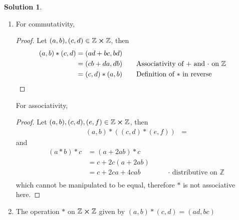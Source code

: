 \documentclass[10pt]{article}
\theoremstyle{definition}
\newtheorem{soln}{Solution}
\newcommand{\justif}[2]{&{#1}&\text{#2}}
\begin{document}
\begin{soln}
\begin{enumerate}[label=(\alph*)]
\begin{proof}
\begin{align*}
                      & = a+ 2a(b+2bc)                                                    \\
                      & = a+ 2ab+4abc\justif{\quad}{$\cdot$ distributive on $\mathbb{Z}$}
            \end{align*}
            and
            \begin{align*}
              (a*b)*c & = (a+2ab)*c                                                        \\
                      & = c+ 2c(a+2ab)                                                     \\
                      & = c+ 2ca+4cab \justif{\quad}{$\cdot$ distributive on $\mathbb{Z}$} \\
            \end{align*}
            which cannot be manipulated to be equal, therefore $*$ is not associative here. \qedhere
          \end{proof}
    \item For commutativity,
          \begin{proof}
            Let $(a,b),(c,d)\in\mathbb{Z}\cross\mathbb{Z}$, then
              \begin{align*}
                (a,b)*(c,d) & =(ad+bc, bd)                                                                 \\
                            & =(cb+da, db)\justif{\quad}{Associativity of $+$ and $\cdot$ on $\mathbb{Z}$} \\
                            & =(c,d)*(a,b)\justif{\quad}{Definition of $*$ in reverse} \qedhere                   
              \end{align*}
          \end{proof}
          For associativity,
          \begin{proof}
            Let $(a,b),(c,d),(e,f)\in\mathbb{Z}\cross\mathbb{Z}$, then
            \begin{align*}
              (a,b)*((c,d)*(e,f)) & = 
            \end{align*}
            and
            \begin{align*}
              (a*b)*c & = (a+2ab)*c                                                        \\
                      & = c+ 2c(a+2ab)                                                     \\
                      & = c+ 2ca+4cab \justif{\quad}{$\cdot$ distributive on $\mathbb{Z}$} \\
            \end{align*}
            which cannot be manipulated to be equal, therefore $*$ is not associative here. \qedhere
          \end{proof}
    \item The operation $*$ on $\mathbb{Z}\cross\mathbb{Z}$ given by $(a,b)*(c,d)=(ad,bc)$
  \end{enumerate}
\end{soln}
\end{document}
